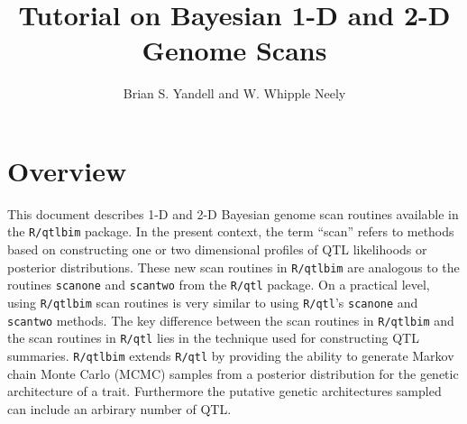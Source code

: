 \documentclass[12pt]{article}
\begin{document}
\title{Tutorial on Bayesian 1-D and 2-D Genome Scans}
\author{Brian S. Yandell and W. Whipple Neely}
\maketitle
\newpage
\tableofcontents
\newpage
{}

\section{Overview}
This document describes 1-D and 2-D Bayesian genome scan routines 
available in the {\tt R/qtlbim} package.  In the present context, the 
term ``scan'' refers to  methods based on constructing one or two 
dimensional profiles of QTL likelihoods or posterior distributions.  
These new scan routines  in {\tt R/qtlbim} are analogous to the 
routines {\tt scanone} and  {\tt scantwo} from  the {\tt R/qtl} 
package.  On a practical level, using {\tt R/qtlbim} scan routines is  
very similar to using {\tt R/qtl}'s  {\tt scanone} and {\tt scantwo} 
methods.   The key difference  between the  scan  routines in  
{\tt R/qtlbim} and the scan routines in {\tt R/qtl} lies in the 
technique used for  constructing QTL summaries.  {\tt R/qtlbim}  
extends {\tt R/qtl} by providing the ability to generate  Markov chain 
Monte Carlo (MCMC) samples from a posterior distribution for 
the genetic architecture of a trait.  Furthermore the putative genetic 
architectures sampled can include an arbirary number of QTL.  
\end{document}

